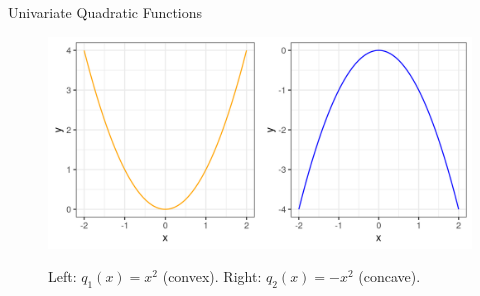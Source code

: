 \begin{vbframe}{Univariate Quadratic Functions}
  \begin{figure}
    \includegraphics[height=0.2\textwidth, keepaspectratio]{figure_man/quadratic_functions_1D.png} \\
    \begin{footnotesize} 
    Left: $q_1(x) = x^2$ (convex). Right: $q_2(x) = - x^2$ (concave). 
    \end{footnotesize}
  \end{figure}
  
  \end{vbframe}
  
